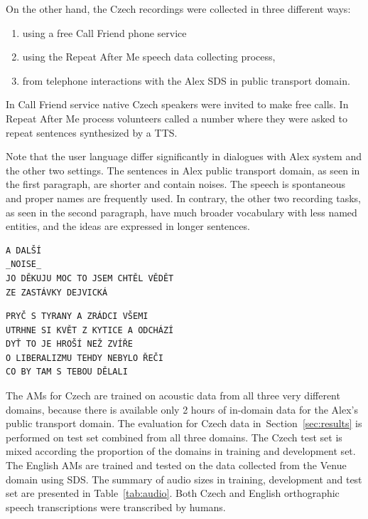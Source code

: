 On the other hand, the Czech recordings were collected in three different ways\cite{korvas_2014}:
\begin{enumerate}
    \item using a free Call Friend phone service
    \item using the Repeat After Me speech data collecting process,
    \item from telephone interactions with the Alex \ac{SDS} in public transport domain.
\end{enumerate}

In Call Friend service native Czech speakers were invited to make free calls.
In Repeat After Me process volunteers called a number where they were asked to repeat 
sentences synthesized by a \ac{TTS}.

Note that the user language differ significantly in dialogues with Alex system and the other two settings.
The sentences in Alex public transport domain, as seen in the first paragraph, are shorter and contain noises.
The speech is spontaneous and proper names are frequently used.
In contrary, the other two recording tasks, as seen in the second paragraph, have much broader vocabulary with less named entities, and the ideas are expressed in longer sentences.

\begin{verbatim}
A DALŠÍ
_NOISE_
JO DĚKUJU MOC TO JSEM CHTĚL VĚDĚT
ZE ZASTÁVKY DEJVICKÁ
\end{verbatim}

\begin{verbatim}
PRYČ S TYRANY A ZRÁDCI VŠEMI
UTRHNE SI KVĚT Z KYTICE A ODCHÁZÍ
DYŤ TO JE HROŠÍ NEŽ ZVÍŘE
O LIBERALIZMU TEHDY NEBYLO ŘEČI
CO BY TAM S TEBOU DĚLALI
\end{verbatim}


The \acp{AM} for Czech are trained on acoustic data from all three very different domains, because there is available only 2 hours of in-domain data for the Alex's public transport domain.
The evaluation for Czech data in~Section~\ref{sec:results} is performed  on test set combined from all three domains.
The Czech test set is mixed according the proportion of the domains in training and development set.
The English \acp{AM} are trained and tested on the data collected from the Venue domain using \ac{SDS}.
The summary of audio sizes in training, development and test set are presented in Table~\ref{tab:audio}.
Both Czech and English orthographic speech transcriptions were transcribed by humans.

